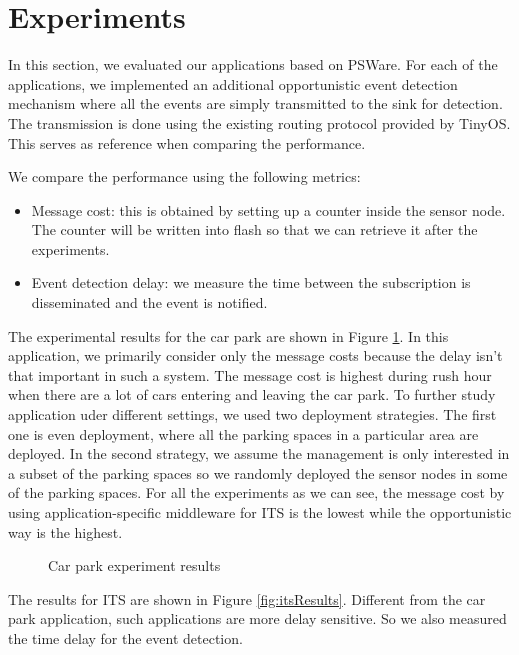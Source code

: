 \section{Experiments}
\label{sec:experiments}
In this section, we evaluated our applications based on PSWare. For each of the applications, we implemented an additional opportunistic event detection mechanism where all the events are simply transmitted to the sink for detection. The transmission is done using the existing routing protocol provided by TinyOS. This serves as reference when comparing the performance.

We compare the performance using the following metrics:
\begin{itemize}
\item Message cost: this is obtained by setting up a counter inside the sensor node. The counter will be written into flash so that we can retrieve it after the experiments.
\item Event detection delay: we measure the time between the subscription is disseminated and the event is notified.
\end{itemize}

The experimental results for the car park are shown in Figure \ref{fig:carParkResults}. In this application, we primarily consider only the message costs because the delay isn't that important in such a system. The message cost is highest during rush hour when there are a lot of cars entering and leaving the car park. To further study application uder different settings, we used two deployment strategies. The first one is even deployment, where all the parking spaces in a particular area are deployed. In the second strategy, we assume the management is only interested in a subset of the parking spaces so we randomly deployed the sensor nodes in some of the parking spaces. For all the experiments as we can see, the message cost by using application-specific middleware for ITS is the lowest while the opportunistic way is the highest.

\begin{figure}
\centering
{}
{}
\caption{Car park experiment results}
\label{fig:carParkResults}
\end{figure}

The results for ITS are shown in Figure \ref{fig:itsResults}. Different from the car park application, such applications are more delay sensitive. So we also measured the time delay for the event detection. %
 
